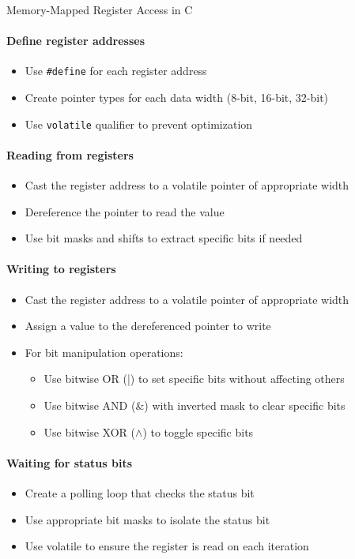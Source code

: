 \begin{KR}{Memory-Mapped Register Access in C}
\paragraph{Define register addresses}
\begin{itemize}
    \item Use \texttt{\#define} for each register address
    \item Create pointer types for each data width (8-bit, 16-bit, 32-bit)
    \item Use \texttt{volatile} qualifier to prevent optimization
\end{itemize}

\paragraph{Reading from registers}
\begin{itemize}
    \item Cast the register address to a volatile pointer of appropriate width
    \item Dereference the pointer to read the value
    \item Use bit masks and shifts to extract specific bits if needed
\end{itemize}

\paragraph{Writing to registers}
\begin{itemize}
    \item Cast the register address to a volatile pointer of appropriate width
    \item Assign a value to the dereferenced pointer to write
    \item For bit manipulation operations:
    \begin{itemize}
        \item Use bitwise OR (|) to set specific bits without affecting others
        \item Use bitwise AND (\&) with inverted mask to clear specific bits
        \item Use bitwise XOR ($\land$) to toggle specific bits
    \end{itemize}
\end{itemize}

\paragraph{Waiting for status bits}
\begin{itemize}
    \item Create a polling loop that checks the status bit
    \item Use appropriate bit masks to isolate the status bit
    \item Use volatile to ensure the register is read on each iteration
\end{itemize}

\end{KR}

